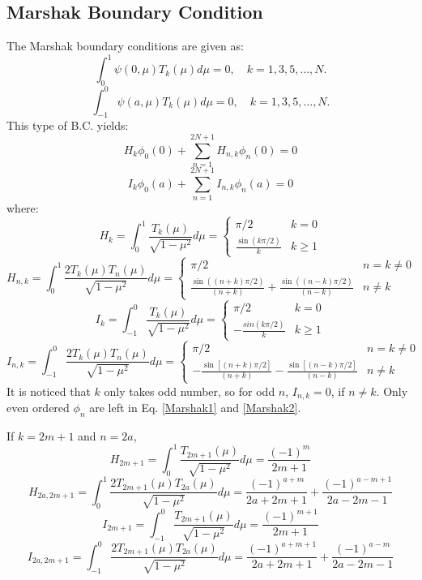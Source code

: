 \documentclass[11pt]{article}
\begin{document}
\begin{spacing}{1.5}
\subsection{Marshak Boundary Condition}
The Marshak boundary conditions are given as:
\[
\int_{0}^{1}\psi(0,\mu)T_k(\mu)d\mu=0,\quad k=1,3,5,\dots,N.
\]
\[
\int_{-1}^{0}\psi(a,\mu)T_k(\mu)d\mu=0,\quad k=1,3,5,\dots,N.
\]
This type of B.C. yields:
\begin{equation}\label{Marshak1}
H_k\phi_0(0)+\sum^{2N+1}_{n=1}H_{n,k}\phi_n(0)=0
\end{equation}
\begin{equation}\label{Marshak2}
I_k\phi_0(a)+\sum^{2N+1}_{n=1}I_{n,k}\phi_n(a)=0
\end{equation}
where:
\[
H_k=\int_0^1\frac{T_k(\mu)}{\sqrt{1-\mu^2}}d\mu=\begin{cases}
\pi/2&k=0\\
\frac{\sin(k\pi/2)}{k}&k\ge1
\end{cases}
\]
\[
H_{n,k}=\int_0^1\frac{2T_k(\mu)T_n(\mu)}{\sqrt{1-\mu^2}}d\mu=\begin{cases}
\pi/2&n=k\ne 0\\
\frac{\sin((n+k)\pi/2)}{(n+k)}+\frac{\sin((n-k)\pi/2)}{(n-k)}&n\ne k
\end{cases}
\]
\[
I_k=\int_{-1}^0\frac{T_k(\mu)}{\sqrt{1-\mu^2}}d\mu=\begin{cases}
\pi/2&k=0\\
-\frac{sin(k\pi/2)}{k}&k\ge1
\end{cases}
\]
\[
I_{n,k}=\int_{-1}^0\frac{2T_k(\mu)T_n(\mu)}{\sqrt{1-\mu^2}}d\mu=\begin{cases}
\pi/2&n=k\ne 0\\
-\frac{\sin[(n+k)\pi/2]}{(n+k)}-\frac{\sin[(n-k)\pi/2]}{(n-k)}&n\ne k
\end{cases}
\]
It is noticed that $k$ only takes odd number, so for odd $n$, $I_{n,k}=0$, if $n\ne k$. Only even ordered $\phi_n$ are left in Eq. \ref{Marshak1} and \ref{Marshak2}.\par
If $k=2m+1$ and $n=2a$,
\[
H_{2m+1}=\int_0^1\frac{T_{2m+1}(\mu)}{\sqrt{1-\mu^2}}d\mu=\frac{(-1)^m}{2m+1}
\]
\[
H_{2a,2m+1}=\int_0^1\frac{2T_{2m+1}(\mu)T_{2a}(\mu)}{\sqrt{1-\mu^2}}d\mu=
\frac{(-1)^{a+m}}{2a+2m+1}+\frac{(-1)^{a-m+1}}{2a-2m-1}
\]
\[
I_{2m+1}=\int_{-1}^0\frac{T_{2m+1}(\mu)}{\sqrt{1-\mu^2}}d\mu=
\frac{(-1)^{m+1}}{2m+1}
\]
\[
I_{2a,2m+1}=\int_{-1}^0\frac{2T_{2m+1}(\mu)T_{2a}(\mu)}{\sqrt{1-\mu^2}}d\mu=
\frac{(-1)^{a+m+1}}{2a+2m+1}+\frac{(-1)^{a-m}}{2a-2m-1}
\]
\end{spacing}
\end{document}
